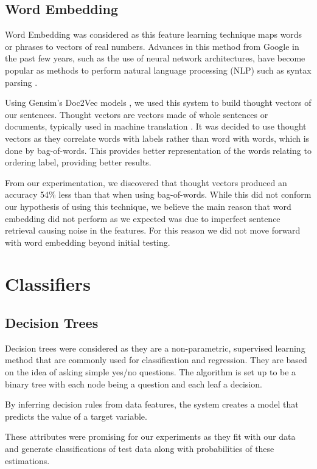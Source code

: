 \documentclass[bsc,frontabs,twoside,singlespacing,parskip,deptreport]{infthesis}     %
\begin{document}
\subsection{Word Embedding}\label{sec:word-embedding}
Word Embedding was considered as this feature learning technique maps words or phrases to vectors of real numbers.
Advances in this method from Google in the past few years, such as the use of neural network architectures, have become
popular as methods to perform natural language processing (NLP) such as syntax parsing \cite{socher2013parsing}.

Using Gensim's Doc2Vec models \cite{rehurek_lrec}, we used this system to build thought vectors of our sentences.
Thought vectors are vectors made of whole sentences or documents, typically used in machine translation \cite{deeplearning4j}.
It was decided to use thought vectors as they correlate words with labels rather than word with words, which is done by bag-of-words.
This provides better representation of the words relating to ordering label, providing better results.



From our experimentation, we discovered that thought vectors produced an accuracy 54\% less than that when
using bag-of-words. While this did not conform our hypothesis of using this technique, we believe
the main reason that word embedding did not perform as we expected was due to imperfect sentence retrieval causing noise in
the features. For this reason we did not move forward with word embedding beyond initial testing.

\section{Classifiers}\label{sec:classifiers}
\subsection{Decision Trees}
Decision trees were considered as they are a non-parametric, supervised learning method that are commonly used for
classification and regression.
They are based on the idea of asking simple yes/no questions. The algorithm is set up to be a binary tree with
each node being a question and each leaf a decision.

By inferring decision rules from data features, the system creates a model that predicts the value of a target variable.

These attributes were promising for our experiments as they fit with our data and generate
classifications of test data along with probabilities of these estimations.
\end{document}

